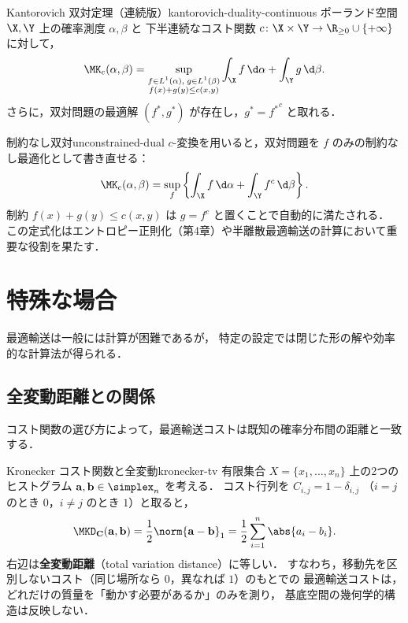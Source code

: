\begin{theorem}{Kantorovich 双対定理（連続版）}{kantorovich-duality-continuous}
  ポーランド空間 $\X, \Y$ 上の確率測度 $\alpha, \beta$ と
  下半連続なコスト関数 $c \colon \X \times \Y \to \R_{\geq 0} \cup \{+\infty\}$ に対して，
  \[
    \MK_c(\alpha, \beta)
    = \sup_{\substack{f \in L^1(\alpha),\; g \in L^1(\beta) \\ f(x) + g(y) \leq c(x,y)}}
    \int_\X f \, \d\alpha + \int_\Y g \, \d\beta.
  \]
  さらに，双対問題の最適解 $(f^*, g^*)$ が存在し，$g^* = {f^*}^c$ と取れる．
\end{theorem}

\begin{remark}{制約なし双対}{unconstrained-dual}
  $c$-変換を用いると，双対問題を $f$ のみの制約なし最適化として書き直せる：
  \[
    \MK_c(\alpha, \beta)
    = \sup_{f}
    \left\{
    \int_\X f \, \d\alpha + \int_\Y f^c \, \d\beta
    \right\}.
  \]
  制約 $f(x) + g(y) \leq c(x, y)$ は $g = f^c$ と置くことで自動的に満たされる．
  この定式化はエントロピー正則化（第4章）や半離散最適輸送の計算において重要な役割を果たす．
\end{remark}

\section{特殊な場合}
\label{sec:special-cases}

最適輸送は一般には計算が困難であるが，
特定の設定では閉じた形の解や効率的な計算法が得られる．

\subsection{全変動距離との関係}
\label{subsec:total-variation}

コスト関数の選び方によって，最適輸送コストは既知の確率分布間の距離と一致する．

\begin{remark}{Kronecker コスト関数と全変動}{kronecker-tv}
  有限集合 $X = \{x_1, \ldots, x_n\}$ 上の2つのヒストグラム
  $\mathbf{a}, \mathbf{b} \in \simplex_n$ を考える．
  コスト行列を $C_{i,j} = 1 - \delta_{i,j}$
  （$i = j$ のとき $0$，$i \neq j$ のとき $1$）と取ると，
  \[
    \MKD_{\mathbf{C}}(\mathbf{a}, \mathbf{b})
    = \frac{1}{2}\norm{\mathbf{a} - \mathbf{b}}_1
    = \frac{1}{2}\sum_{i=1}^n \abs{a_i - b_i}.
  \]
  右辺は\textbf{全変動距離}（total variation distance）に等しい．
  すなわち，移動先を区別しないコスト（同じ場所なら $0$，異なれば $1$）のもとでの
  最適輸送コストは，どれだけの質量を「動かす必要があるか」のみを測り，
  基底空間の幾何学的構造は反映しない．
\end{remark}

